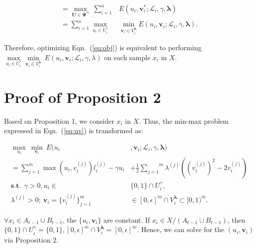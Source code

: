 \documentclass[journal]{IEEEtran}
\begin{document}
{\begin{small}
\begin{displaymath}
			\begin{aligned}
			=
			\underset{\mathbf{U}\in\mathbf{\Psi}^{\bm \gamma}}{\max}\ \sum^n_{i=1} & E(u_i,\mathbf{v}^\ast_i;\mathcal{L}_i,\gamma,{\bm \lambda})
			\\=\sum^n_{i=1} \max_{u_i\in U^\gamma_i}  & \min_{\mathbf{v}_i\in V^{\bm \lambda}_i} E(u_i,\mathbf{v}_i;\mathcal{L}_i,\gamma,{\bm \lambda}).
			\end{aligned}
			\end{displaymath}
		\end{small}
Therefore, optimizing Eqn.~(\ref{eq:obj}) is equivalent to {performing} $\underset{u_i\in U^\gamma_i}{\max} \underset{\mathbf{v}_i\in V^{\bm \lambda}_i}{\min} \  E(u_i,\mathbf{v}_i;\mathcal{L}_i,\gamma,\lambda)$ on each sample $x_i$ in $X$. 
	
{
\section{Proof of Proposition 2}
\label{sec:p2}
	
	Based on Proposition 1, we consider $x_i$ in $X$. Thus, the min-max problem expressed in Eqn.~(\ref{eq:uv}) is transformed as:	
	\begin{small}\begin{equation}\begin{aligned}
		\underset{u_i}{\max} \ \underset{\mathbf{v}_i}{\min} \  E(u_i&,\mathbf{v}_i;\mathcal{L}_i,\gamma,{\bm \lambda}) \\= \sum_{j=1}^{m}\max(u_i,v_i^{(j)})l_i^{(j)} -\gamma u_i &+ \frac{1}{2}\overset{m}{\underset{j=1}{\sum}}\lambda^{(j)}((v_i^{(j)})^2-2v_i^{(j)}) \\  \mathbf{s.t.} \ \ \gamma > 0, u_i \in& \{0,1\}\cap U^{\gamma}_i, \\ \lambda^{(j)} > 0; \ \mathbf{v}_i=\{v_i^{(j)}\}^m_{j=1}& \in [0,\epsilon]^m\cap V^{\bm \lambda}_i \subset [0,1)^m.
		\label{eq6}\end{aligned}
		\end{equation}\end{small}$\forall x_i\in A_{t-1}\cup B_{t-1}$, the $\{u_i,\mathbf{v}_i\}$ are constant. If $x_i\in X/(A_{t-1}\cup B_{t-1})$, then $\{0,1\}\cap U^{\gamma}_i=\{0,1\}, [0,\epsilon]^m\cap V^{\bm \lambda}_i = [0,\epsilon]^m$. Hence, we can solve for the $(u_i,\mathbf{v}_i)$ via Proposition 2. 
		
}}
\end{document}
